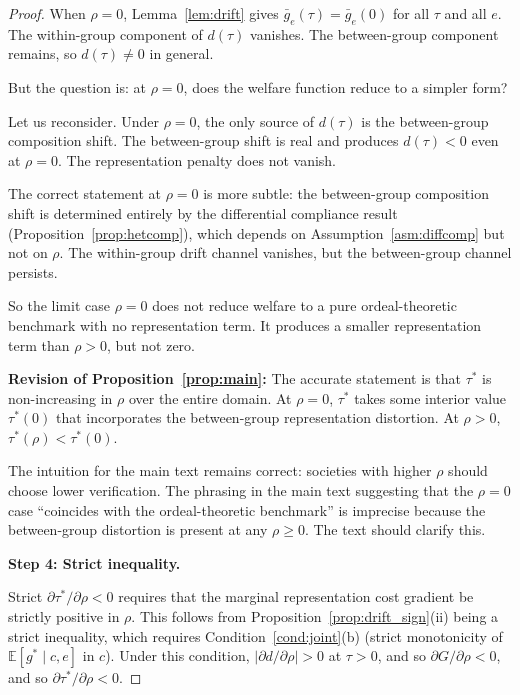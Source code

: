 \begin{proof}
When $\rho = 0$, Lemma~\ref{lem:drift} gives $\bar g_e(\tau) = \bar g_e(0)$ for all $\tau$ and all $e$. The within-group component of $d(\tau)$ vanishes. The between-group component remains, so $d(\tau) \neq 0$ in general.

But the question is: at $\rho = 0$, does the welfare function reduce to a simpler form?

Let us reconsider. Under $\rho = 0$, the only source of $d(\tau)$ is the between-group composition shift. The between-group shift is real and produces $d(\tau) < 0$ even at $\rho = 0$. The representation penalty does not vanish.

The correct statement at $\rho = 0$ is more subtle: the between-group composition shift is determined entirely by the differential compliance result (Proposition~\ref{prop:hetcomp}), which depends on Assumption~\ref{asm:diffcomp} but not on $\rho$. The within-group drift channel vanishes, but the between-group channel persists.

So the limit case $\rho = 0$ does not reduce welfare to a pure ordeal-theoretic benchmark with no representation term. It produces a smaller representation term than $\rho > 0$, but not zero.

\textbf{Revision of Proposition~\ref{prop:main}:} The accurate statement is that $\tau^*$ is non-increasing in $\rho$ over the entire domain. At $\rho = 0$, $\tau^*$ takes some interior value $\tau^*(0)$ that incorporates the between-group representation distortion. At $\rho > 0$, $\tau^*(\rho) < \tau^*(0)$.

The intuition for the main text remains correct: societies with higher $\rho$ should choose lower verification. The phrasing in the main text suggesting that the $\rho = 0$ case ``coincides with the ordeal-theoretic benchmark'' is imprecise because the between-group distortion is present at any $\rho \geq 0$. The text should clarify this.

\textbf{Step 4: Strict inequality.}

Strict $\partial \tau^*/\partial \rho < 0$ requires that the marginal representation cost gradient be strictly positive in $\rho$. This follows from Proposition~\ref{prop:drift_sign}(ii) being a strict inequality, which requires Condition~\ref{cond:joint}(b) (strict monotonicity of $\mathbb{E}[g^* \mid c, e]$ in $c$). Under this condition, $|\partial d / \partial \rho| > 0$ at $\tau > 0$, and so $\partial G/\partial \rho < 0$, and so $\partial \tau^*/\partial \rho < 0$.
\end{proof}

